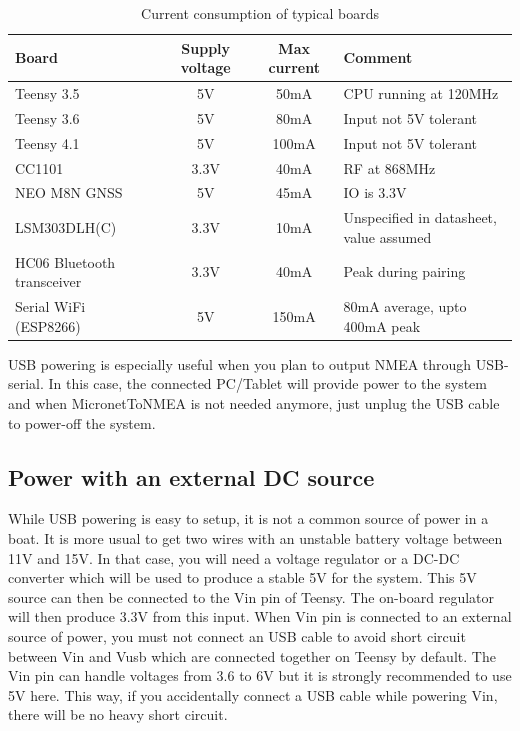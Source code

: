 \documentclass{report}
\begin{document}
\begin{table}[h]
	\begin{tabular}{|l|c|c|l|}
		\hline
		Board & Supply voltage & Max current & Comment \\
		\hline
		Teensy 3.5 & 5V & 50mA & CPU running at 120MHz\\
		Teensy 3.6 & 5V & 80mA & Input not 5V tolerant\\
		Teensy 4.1 & 5V & 100mA & Input not 5V tolerant\\
		CC1101 & 3.3V & 40mA & RF at 868MHz\\
		NEO M8N GNSS & 5V & 45mA & IO is 3.3V\\
		LSM303DLH(C) & 3.3V & 10mA & Unspecified in datasheet, value assumed\\
		HC06 Bluetooth transceiver & 3.3V & 40mA & Peak during pairing\\
		Serial WiFi (ESP8266) & 5V & 150mA & 80mA average, upto 400mA peak\\
		\hline
	\end{tabular}
	\caption{Current consumption of typical boards}
	\label{table:boardconsumption}
\end{table}
USB powering is especially useful when you plan to output NMEA through USB-serial. In this case, the connected PC/Tablet will provide power to the system and when MicronetToNMEA is not needed anymore, just unplug the USB cable to power-off the system.

\subsection{Power with an external DC source}
While USB powering is easy to setup, it is not a common source of power in a boat. It is more usual to get two wires with an unstable battery voltage between 11V and 15V. In that case, you will need a voltage regulator or a DC-DC converter which will be used to produce a stable 5V for the system. This 5V source can then be connected to the Vin pin of Teensy. The on-board regulator will then produce 3.3V from this input.
\linebreak
When Vin pin is connected to an external source of power, you must not connect an USB cable to avoid short circuit between Vin and Vusb which are connected together on Teensy by default. The Vin pin can handle voltages from 3.6 to 6V but it is strongly recommended to use 5V here. This way, if you accidentally connect a USB cable while powering Vin, there will be no heavy short circuit.
\end{document}
